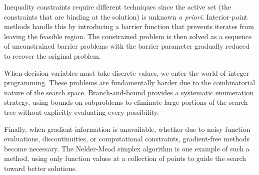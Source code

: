 Inequality constraints require different techniques since the active set (the constraints that are binding at the solution) is unknown \emph{a priori}. Interior-point methods handle this by introducing a barrier function that prevents iterates from leaving the feasible region. The constrained problem is then solved as a sequence of unconstrained barrier problems with the barrier parameter gradually reduced to recover the original problem.

When decision variables must take discrete values, we enter the world of integer programming. These problems are fundamentally harder due to the combinatorial nature of the search space. Branch-and-bound provides a systematic enumeration strategy, using bounds on subproblems to eliminate large portions of the search tree without explicitly evaluating every possibility.

Finally, when gradient information is unavailable, whether due to noisy function evaluations, discontinuities, or computational constraints, gradient-free methods become necessary. The Nelder-Mead simplex algorithm is one example of such a method, using only function values at a collection of points to guide the search toward better solutions.

